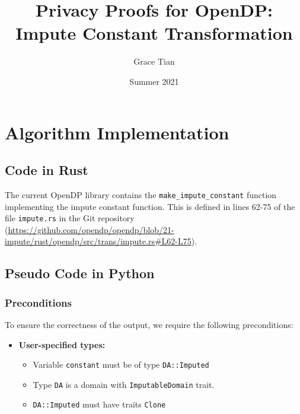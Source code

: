 

\newcommand{\silvia}[1]{{ {\color{blue}{(silvia)~#1}}}}
\newcommand{\grace}[1]{{ {\color{purple}{(grace)~#1}}}}
\newcommand{\connor}[1]{{ {\color{teal}{(connor)~#1}}}}
\newcommand{\mike}[1]{{ {\color{green}{(mike)~#1}}}}
\newcommand{\todo}{{\textcolor{red}{TODO }}}

\title{Privacy Proofs for OpenDP: Impute Constant Transformation}
\author{Grace Tian}
\date{Summer 2021}



\maketitle
\tableofcontents

\section{Algorithm Implementation}
\subsection{Code in Rust}
The current OpenDP library contains the \texttt{make\_impute\_constant} function implementing the impute constant function. This is defined in lines 62-75 of the file \texttt{impute.rs} in the Git repository (\url{https://github.com/opendp/opendp/blob/21-impute/rust/opendp/src/trans/impute.rs#L62-L75}).

\subsection{Pseudo Code in Python}\label{sec:pseudocode}

\subsubsection*{Preconditions}
To ensure the correctness of the output, we require the following preconditions:

\begin{itemize}
    \item \textbf{User-specified types:}
    \begin{itemize}
        \item Variable \texttt{\texttt{constant}} must be of type \texttt{DA::Imputed}
        \item Type \texttt{DA} is a domain with \texttt{ImputableDomain} trait. %
        \item \texttt{DA::Imputed} must have traits \texttt{Clone}
    \end{itemize}
\end{itemize}


